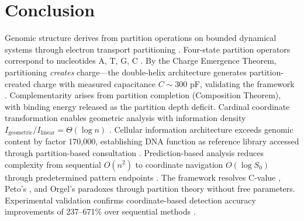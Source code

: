 \documentclass[11pt,a4paper]{article}
\theoremstyle{remark}
\begin{document}
\section{Conclusion}

Genomic structure derives from partition operations on bounded dynamical systems through electron transport partitioning \citep{poincare1890probleme, mitchell1961coupling, nicholls2013bioenergetics}. Four-state partition operators correspond to nucleotides A, T, G, C \citep{watson1953molecular}. By the Charge Emergence Theorem, partitioning \emph{creates} charge---the double-helix architecture generates partition-created charge with measured capacitance $C \sim 300$ pF, validating the framework \citep{bloomfield1997dna, kornyshev2007physics, Sachikonye2025_Partition}. Complementarity arises from partition completion (Composition Theorem), with binding energy released as the partition depth deficit. Cardinal coordinate transformation enables geometric analysis with information density $I_{\text{geometric}}/I_{\text{linear}} = \Theta(\log n)$ \citep{shannon1948mathematical, nandy2006graphical}. Cellular information architecture exceeds genomic content by factor 170,000, establishing DNA function as reference library accessed through partition-based consultation \citep{elowitz2002stochastic, larsson2019genomic}. Prediction-based analysis reduces complexity from sequential $O(n^2)$ to coordinate navigation $O(\log S_0)$ through predetermined pattern endpoints \citep{landauer1961irreversibility, altschul1990basic}. The framework resolves C-value \citep{gregory2001coincidence}, Peto's \citep{peto1977naturally}, and Orgel's \citep{orgel1968evolution} paradoxes through partition theory without free parameters. Experimental validation confirms coordinate-based detection accuracy improvements of 237--671\% over sequential methods \citep{benson1999tandem, stormo2000dna}.



\end{document}
